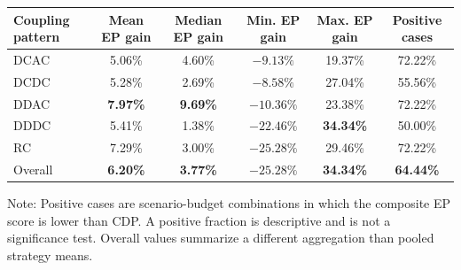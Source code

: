 \documentclass[10pt]{article}
\makeatletter
\newcommand{\best}[1]{\textbf{#1}}
\newenvironment{threeparttable}{}{}
\newenvironment{tablenotes}[1][]{\par\vspace{2pt}\begin{minipage}{.98\linewidth}\begin{list}{}{\leftmargin=0pt\labelwidth=0pt\itemsep=0pt\parsep=0pt}}{\end{list}\end{minipage}}
\newenvironment{exporttable}{\par\noindent\begin{minipage}{\linewidth}\def\@captype{table}}{\end{minipage}\par}
\makeatother
\begin{document}
\begin{exporttable}
\centering
\small
\begin{threeparttable}
\caption{Scenario-level gains over CDP for the comprehensive policy library. The 6.20\% mean of relative scenario gains differs from the 3.0\% gain of pooled means.}
\label{tab:scenario_improvement_cdp}
\begin{tabular}{lccccc}
\toprule
\rowcolor{TableHeader}
Coupling pattern 
& Mean EP gain 
& Median EP gain 
& Min. EP gain 
& Max. EP gain 
& Positive cases \\
\midrule
\rowcolor{RowScenario}
DCAC & 5.06\% & 4.60\% & $-9.13\%$ & 19.37\% & 72.22\% \\
\rowcolor{RowBaseline}
DCDC & 5.28\% & 2.69\% & $-8.58\%$ & 27.04\% & 55.56\% \\
\rowcolor{RowProposed}
DDAC & \best{7.97\%} & \best{9.69\%} & $-10.36\%$ & 23.38\% & 72.22\% \\
\rowcolor{RowRisk}
DDDC & 5.41\% & 1.38\% & $-22.46\%$ & \best{34.34\%} & 50.00\% \\
\rowcolor{RowPhysical}
RC & 7.29\% & 3.00\% & $-25.28\%$ & 29.46\% & 72.22\% \\
\midrule
\rowcolor{RowProposed}
Overall & \best{6.20\%} & \best{3.77\%} & $-25.28\%$ & \best{34.34\%} & \best{64.44\%} \\
\bottomrule
\end{tabular}
\begin{tablenotes}
\footnotesize
\item Note: Positive cases are scenario-budget combinations in which the composite EP score is lower than CDP. A positive fraction is descriptive and is not a significance test. Overall values summarize a different aggregation than pooled strategy means.
\end{tablenotes}
\end{threeparttable}
\end{exporttable}
\clearpage
\setcounter{table}{5}
\end{document}
